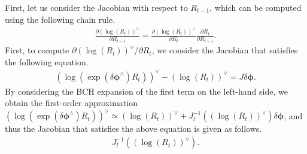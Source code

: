 First, let us consider the Jacobian with respect to $R_{t-1}$, which can be computed using the following chain rule.
%
\begin{align}
  \frac{ \partial \left( \log \left( R_{t} \right) \right)^{\vee} }{ \partial R_{t-1} }
  =
  \frac{ \partial \left( \log \left( R_{t} \right) \right)^{\vee} }{ \partial R_{t} }
  \frac{ \partial R_{t} }{ \partial R_{t-1} }.
  \label{eq:dlogRt_dRt-1}
\end{align}
%
First, to compute $\partial \left( \log \left( R_{t} \right) \right)^{\vee} / \partial R_{t}$, we consider the Jacobian that satisfies the following equation.
%
\begin{align}
  \left( \log \left( \exp \left( \delta \boldsymbol \phi^{\wedge} \right) R_{t} \right) \right)^{\vee} - \left( \log \left( R_{t} \right) \right)^{\vee} = J \delta \boldsymbol \phi.
\end{align}
%
By considering the BCH expansion of the first term on the left-hand side, we obtain the first-order approximation
$\left( \log \left( \exp \left( \delta \boldsymbol \phi^{\wedge} \right) R_{t} \right) \right)^{\vee} \simeq \left( \log \left( R_{t} \right) \right)^{\vee} + J_{l}^{-1} \left( \left( \log \left( R_{t} \right) \right)^{\vee} \right) \delta \boldsymbol \phi$,
and thus the Jacobian that satisfies the above equation is given as follows.
%
\begin{align}
  J_{l}^{-1} \left( \left( \log \left( R_{t} \right) \right)^{\vee} \right).
  \label{eq:dlogRt_dRt}
\end{align}
%

